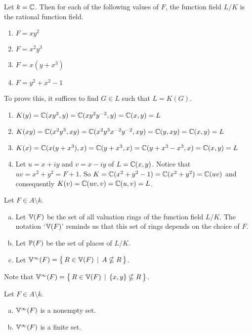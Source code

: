 \begin{example} \label {ue0982rhr329r23jew}
Let $k = \mathbb{C}$. Then for each of
the following values of $F$, the function 
field $L/K$ is the rational 
function field.

\begin{enumerate}
	\item $F = xy^2$
	\item $F = x^2y^3$
	\item $F = x(y+x^3)$ 
	\item $F = y^2 + x^2 - 1$
\end{enumerate}
To prove this, it suffices to find $G \in L$ such that $L = K(G)$.
\begin{enumerate}
	\item $K(y)=\mathbb{C} (xy^2,y) = \mathbb{C} (xy^2y^{-2},y)=\mathbb{C} (x,y) = L$
	\item $K(xy)=\mathbb{C}(x^2y^3,xy)=\mathbb{C}(x^2y^3x^{-2}y^{-2},xy)=\mathbb{C}(y,xy)=\mathbb{C}(x,y)=L$
	\item $K(x)= \mathbb{C}(x(y+x^3),x)=\mathbb{C}(y+x^3,x)=\mathbb{C}(y+x^3 - x^3,x)=\mathbb{C}(x,y)=L$ 
	\item Let $u = x+iy$ and $v=x-iy$ of $L=\mathbb{C}(x,y)$. 
	Notice that $uv=x^2+y^2 = F + 1$.  
	So $K = \mathbb{C}(x^2+y^2-1) = \mathbb{C}(x^2+y^2) = \mathbb{C}(uv)$ and
	consequently $K(v) = \mathbb{C}(uv,v) = \mathbb{C}(u,v) = L$.
\end{enumerate} 
\end{example}

\begin{notation}
Let $F \in A \setminus  k$.
\begin{enumerate}[(a)]
\item Let $\mathbb{V}(F)$ be the set of all valuation rings of the function field $L/K$.
The notation `$\mathbb{V}(F)$' reminds us that this set of rings depends on the choice of $F$.

\item Let $\mathbb{P}(F)$ be the set of places of $L/K$.

\item Let $\mathbb{V}^\infty(F) = \big\{\, R \in \mathbb{V}(F) \, \mid \, A \nsubseteq R \, \big\}$.

\end{enumerate}
Note that $\mathbb{V}^\infty(F) = \big\{\, R \in \mathbb{V}(F) \, \mid \, \{x,y\} \nsubseteq R \, \big\}$.
\end{notation}


\begin{proposition} \label {3o9jdb9182so}
Let $F \in A \setminus  k$.
\begin{enumerate}[(a)]
\item \label{notmempty} $\mathbb{V}^\infty(F)$ is a nonempty set.
\item \label{finite} $\mathbb{V}^\infty(F)$ is a finite set.
\end{enumerate}
\end{proposition}

